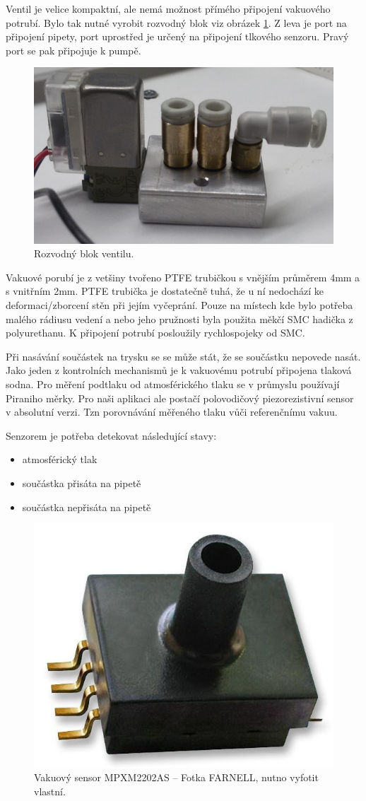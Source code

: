 Ventil je velice kompaktní, ale nemá možnost přímého připojení vakuového potrubí. Bylo tak nutné vyrobit rozvodný blok viz obrázek \ref{fig:ventilblok}.  Z leva je port na připojení pipety, port uprostřed je určený na připojení tlkového senzoru. Pravý port se pak připojuje k pumpě. 

\begin{figure}[h!]
  \centering
    \includegraphics[width=0.7\linewidth]{obrazky/blok.jpg}%
    \caption{Rozvodný blok ventilu.}
    \label{fig:ventilblok}
\end{figure}

Vakuové porubí je z vetšiny tvořeno PTFE trubičkou s vnějším průměrem 4mm a s vnitřním 2mm. PTFE trubička je dostatečně tuhá, že u ní nedochází ke deformaci/zborcení stěn při jejím vyčeprání. Pouze na místech kde bylo potřeba malého rádiusu vedení a nebo jeho pružnosti byla použita měkčí SMC hadička z polyurethanu. K připojení potrubí posloužily rychlospojeky od SMC.

Při nasávání součástek na trysku se se může stát, že se součástku nepovede nasát. Jako jeden z kontrolních mechanismů je k vakuovému potrubí připojena tlaková sodna. Pro měření podtlaku od atmosférického tlaku se v průmyslu používají Piraniho měrky. Pro naši aplikaci ale postačí polovodičový piezorezistivní sensor v absolutní verzi. Tzn porovnávání měřeného tlaku vůči referenčnímu vakuu. 

Senzorem je potřeba detekovat následující stavy:
\begin{itemize}
\item atmosférický tlak
\item součástka přisáta na pipetě
\item součástka nepřisáta na pipetě
\end{itemize}


\begin{figure}[h!]
  \centering
    \includegraphics[width=0.4\linewidth]{obrazky/sensor.jpg}%
    \caption{Vakuový sensor  MPXM2202AS – Fotka FARNELL, nutno vyfotit vlastní.}
    \label{fig:sensor}
\end{figure}

